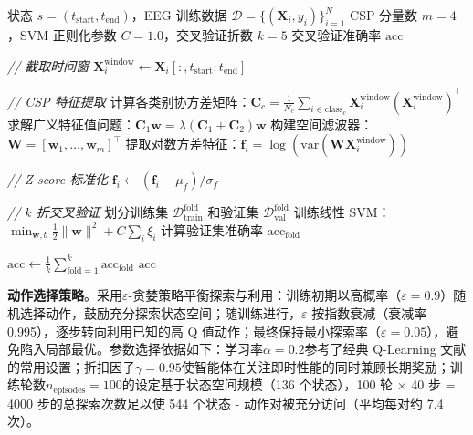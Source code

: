 \begin{algorithm}[H]
\caption{时间窗评估函数 $\text{EvaluateWindow}$}
\label{alg:evaluate}
\begin{algorithmic}[1]
\REQUIRE 状态 $s = (t_{\text{start}}, t_{\text{end}})$，EEG 训练数据 $\mathcal{D} = \{(\mathbf{X}_i, y_i)\}_{i=1}^N$
\REQUIRE CSP 分量数 $m = 4$，SVM 正则化参数 $C = 1.0$，交叉验证折数 $k = 5$
\ENSURE 交叉验证准确率 $\text{acc}$

\STATE \textit{// 截取时间窗}
    \STATE $\mathbf{X}_i^{\text{window}} \leftarrow \mathbf{X}_i[:, t_{\text{start}}:t_{\text{end}}]$
\ENDFOR

\STATE \textit{// CSP 特征提取}
\STATE 计算各类别协方差矩阵：$\mathbf{C}_c = \frac{1}{N_c} \sum_{i \in \text{class}_c} \mathbf{X}_i^{\text{window}} (\mathbf{X}_i^{\text{window}})^\top$
\STATE 求解广义特征值问题：$\mathbf{C}_1 \mathbf{w} = \lambda (\mathbf{C}_1 + \mathbf{C}_2) \mathbf{w}$
\STATE 构建空间滤波器：$\mathbf{W} = [\mathbf{w}_1, \dots, \mathbf{w}_m]^\top$
\STATE 提取对数方差特征：$\mathbf{f}_i = \log(\text{var}(\mathbf{W} \mathbf{X}_i^{\text{window}}))$

\STATE \textit{// Z-score 标准化}
\STATE $\mathbf{f}_i \leftarrow (\mathbf{f}_i - \mu_f) / \sigma_f$

\STATE \textit{// $k$ 折交叉验证}
    \STATE 划分训练集 $\mathcal{D}_{\text{train}}^{\text{fold}}$ 和验证集 $\mathcal{D}_{\text{val}}^{\text{fold}}$
    \STATE 训练线性 SVM：$\min_{\mathbf{w},b} \frac{1}{2}\|\mathbf{w}\|^2 + C \sum_i \xi_i$
    \STATE 计算验证集准确率 $\text{acc}_{\text{fold}}$
\ENDFOR

\STATE $\text{acc} \leftarrow \frac{1}{k} \sum_{\text{fold}=1}^k \text{acc}_{\text{fold}}$
\STATE \RETURN $\text{acc}$
\end{algorithmic}
\end{algorithm}

\textbf{动作选择策略}。采用$\varepsilon$-贪婪策略平衡探索与利用：训练初期以高概率（$\varepsilon = 0.9$）随机选择动作，鼓励充分探索状态空间；随训练进行，$\varepsilon$ 按指数衰减（衰减率 0.995），逐步转向利用已知的高 Q 值动作；最终保持最小探索率（$\varepsilon = 0.05$），避免陷入局部最优。参数选择依据如下：学习率$\alpha = 0.2$参考了经典 Q-Learning 文献的常用设置；折扣因子$\gamma = 0.95$使智能体在关注即时性能的同时兼顾长期奖励；训练轮数$n_{\text{episodes}} = 100$的设定基于状态空间规模（136 个状态），100 轮 × 40 步 = 4000 步的总探索次数足以使 544 个状态 - 动作对被充分访问（平均每对约 7.4 次）。


